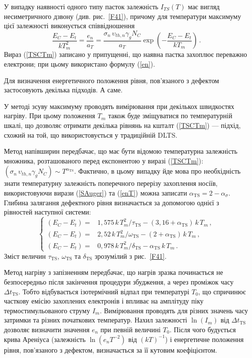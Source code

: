 У випадку наявності одного типу пасток залежність $I_{TS}(T)$ має вигляд
несиметричного дзвону (див. рис.~\ref{F41}),
причому для температури максимуму цієї залежності виконується співвідношення
\begin{equation}
\label{TSCTm}
\frac{E_C-E_t}{kT_m^2}=\frac{e_n}{a_T}=\frac{\sigma_n\,\upsilon_{th,n}\gamma_g N_C}{a_T}\exp\left(-\frac{E_C-E_t}{kT_m}\right)\,.
\end{equation}
Вираз (\ref{TSCTm}) записано у припущенні, що наявна пастка захоплює переважно електрони;
при цьому використано формулу (\ref{en}).

Для визначення енергетичного положення рівня, пов'язаного з дефектом застосовують декілька підходів.
А саме.

У методі зсуву максимуму проводять вимірювання при декількох швидкостях нагріву.
При цьому положення $T_m$ також буде зміщуватися по температурній шкалі, що
дозволяє отримати декілька рівнянь на кшталт (\ref{TSCTm}) ---
підхід, схожий на той, що використовується у традиційній DLTS.

Метод напівширин передбачає, що має бути відомою температурна залежність
множника, розташованого перед експонентою у виразі (\ref{TSCTm}):
$(\sigma_n\,\upsilon_{th,n}\gamma_g N_C)\sim T^{\alpha_{\mathrm{TS}}}$.
Фактично, в цьому випадку йде мова про необхідність знати температурну залежність
поперечного перерізу захоплення носіїв,
використовуючи вирази (\ref{SAuger}) та (\ref{enT}) можна записати $\alpha_{\mathrm{TS}}=2-\alpha_\sigma$.
Глибина залягання дефектного рівня визначається
за допомогою однієї з рівностей наступної системи:
\begin{equation}\label{TSCsemi}
\left\{
\begin{aligned}%
(E_C-E_t)=&1,575\,k\,T_m^2/\tau_{\mathrm{TS}} -(3,16+\alpha_{\mathrm{TS}})\,k\,T_m\,,\\
(E_C-E_t)=&2,52\,k\,T_m^2/\omega_{\mathrm{TS}} -(2+\alpha_{\mathrm{TS}})\,k\,T_m\,,\\
(E_C-E_t)=&0,978\,k\,T_m^2/\delta_{\mathrm{TS}} -\alpha_{\mathrm{TS}}\,k\,T_m\,.
\end{aligned} \right.
\end{equation}
Зміст величин $\tau_{\mathrm{TS}}$, $\omega_{\mathrm{TS}}$ та $\delta_{\mathrm{TS}}$
зрозумілий з рис.~\ref{F41}.

Метод нагріву з запізненням передбачає,
що нагрів зразка починається не безпосередньо після закінчення
процедури збудження,
а через проміжок часу $\Delta t_\mathrm{TS}$.
Тобто відбувається ізотермічний відпал при температурі $T_0$,
що спричинює часткову емісію захоплених електронів і впливає
на амплітуду піку термостимульованого струму $I_m$.
Вимірювання проводять для різних значень часу
затримки та різних початкових температур.
Нахил залежності $\ln(I_m)$ від $\Delta t_\mathrm{TS}$
дозволяє визначити значення $e_n$ при певній величині $T_0$.
Після чого будується крива Ареніуса
(залежність $\ln(e_nT^{-2})$ від $(kT)^{-1}$) і енергетичне
положення рівня, пов'язаного з дефектом, визначається за її кутовим
коефіцієнтом.

